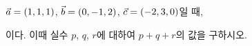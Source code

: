 $\vec{a}=(1{,}\mkern3mu\mathopen{}1{,}\mkern3mu\mathopen{}1)$, $\vec{b}=(0{,}\mkern3mu\mathopen{}-1{,}\mkern3mu\mathopen{}2)$, $\vec{c}=(-2{,}\mkern3mu\mathopen{}3{,}\mkern3mu\mathopen{}0)$일 때, \par\smallskip{}\par\smallskip\noindent 이다. 이때 실수 $p$, $q$, $r$에 대하여 $p+q+r$의 값을 구하시오.

